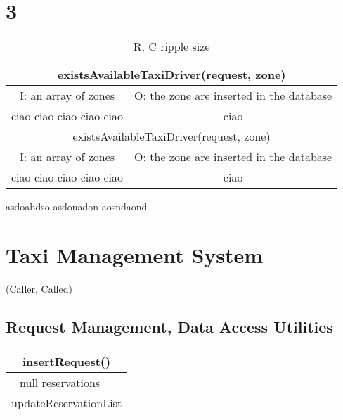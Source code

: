 \documentclass[11pt,oneside,a4paper]{report}
\begin{document}
\chapter{3}
\begin{table}[ph]
  \centering
  \begin{tabular}{c|c}
    \hline
   \multicolumn{2}{c}{existsAvailableTaxiDriver(request, zone)}\\\hline
   I: an array of zones & O:  the zone are inserted in the database \\\hline
   ciao ciao ciao ciao ciao & ciao\\
   \hline\hline
      \multicolumn{2}{c}{existsAvailableTaxiDriver(request, zone)}\\\hline
      I: an array of zones & O:  the zone are inserted in the database \\\hline
      ciao ciao ciao ciao ciao & ciao\\
  \end{tabular}
  \caption{R, C ripple size}
\end{table}
asdoabdso asdonadon aosndaond


\chapter{Taxi Management System}
{\Huge (Caller, Called)}
\section{Request Management, Data Access Utilities}
\begin{table}[ph]
\centering
\begin{tabular}{c|c}
\hline
\multicolumn{2}{c}{insertRequest()}\\\hline\hline
null
reservations & \\\hline
\multicolumn{2}{c}{updateReservationList}\\\hline
\end{tabular}
\end{table}
\end{document}
